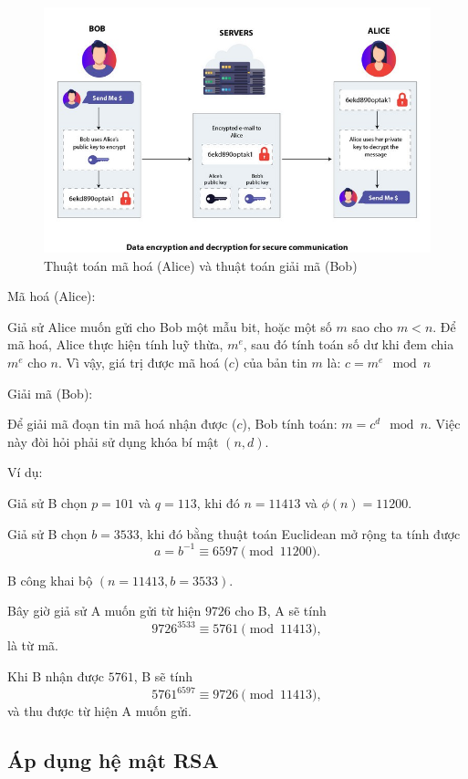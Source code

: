 \documentclass{article}
\begin{document}
\begin{figure}[H]
    \centering
    \includegraphics[scale = 0.4]{pictures/Bob_Alice.jpg}
    \caption{Thuật toán mã hoá (Alice) và thuật toán giải mã (Bob)}
\end{figure}


Mã hoá (Alice):

 

Giả sử Alice muốn gửi cho Bob một mẫu bit, hoặc một số $m$ sao cho $m < n$. Để mã hoá, Alice thực hiện tính luỹ thừa, $m^e$, sau đó tính toán số dư khi đem chia $m^e$ cho $n$. Vì vậy, giá trị được mã hoá ($c$) của bản tin $m$ là:  $c = m^e \mod n $


Giải mã (Bob):

Để giải mã đoạn tin mã hoá nhận được ($c$), Bob tính toán: $ m = c^d \mod n $. Việc này đòi hỏi phải sử dụng khóa bí mật $(n, d)$.



Ví dụ:

Giả sử B chọn $p = 101$ và $q = 113$, khi đó $n = 11413$ và $\phi(n) = 11200$.

Giả sử B chọn $b = 3533$, khi đó bằng thuật toán Euclidean mở rộng ta tính được
\[a = b^{-1} \equiv 6597 \pmod{11200}.\]

B công khai bộ $(n = 11413, b = 3533)$.



Bây giờ giả sử A muốn gửi từ hiện $9726$ cho B, A sẽ tính 
\[9726^{3533} \equiv 5761 \pmod{11413},\] 
là từ mã. 

Khi B nhận được $5761$, B sẽ tính 
\[5761^{6597} \equiv 9726 \pmod{11413},\] 
và thu được từ hiện A muốn gửi.





\subsection{Áp dụng hệ mật RSA}
\end{document}
